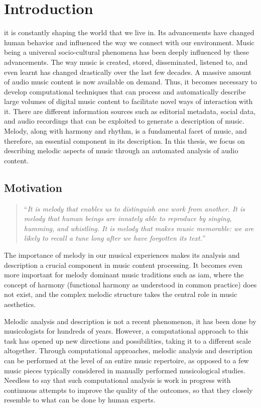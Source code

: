 
\glsresetall

\chapter{Introduction}
\label{chap:intro}

\Gls{it} is constantly shaping the world that we live in. Its advancements have changed human behavior and influenced the way we connect with our environment. Music being a universal socio-cultural phenomena has been deeply influenced by these advancements. The way music is created, stored, disseminated, listened to, and even learnt has changed drastically over the last few decades. A massive amount of audio music content is now available on demand. Thus, it becomes necessary to develop computational techniques that can process and automatically describe large volumes of digital music content to facilitate novel ways of interaction with it. There are different information sources such as editorial metadata, social data, and audio recordings that can be exploited to generate a description of music. Melody, along with harmony and rhythm, is a fundamental facet of music, and therefore, an essential component in its description. In this thesis, we focus on describing melodic aspects of music through an automated analysis of audio content. 

\section{Motivation}
\label{sec:motivation}

\blockcquote[]{selfridge1998conceptual}{``\textit{It is melody that enables us to distinguish one work from another. It is melody that human beings are innately able to reproduce by singing, humming, and whistling. It is melody that makes music memorable: we are likely to recall a tune long after we have forgotten its text.}''}

The importance of melody in our musical experiences makes its analysis and description a crucial component in music content processing. It becomes even more important for melody dominant music traditions such as \gls{iam}, where the concept of harmony (functional harmony as understood in common practice) does not exist, and the complex melodic structure takes the central role in music aesthetics.

Melodic analysis and description is not a recent phenomenon, it has been done by musicologists for hundreds of years. However, a computational approach to this task has opened up new directions and possibilities, taking it to a different scale altogether. Through computational approaches, melodic analysis and description can be performed at the level of an entire music repertoire, as opposed to a few music pieces typically considered in manually performed musicological studies. Needless to say that such computational analysis is work in progress with continuous attempts to improve the quality of the outcomes, so that they closely resemble to what can be done by human experts.

